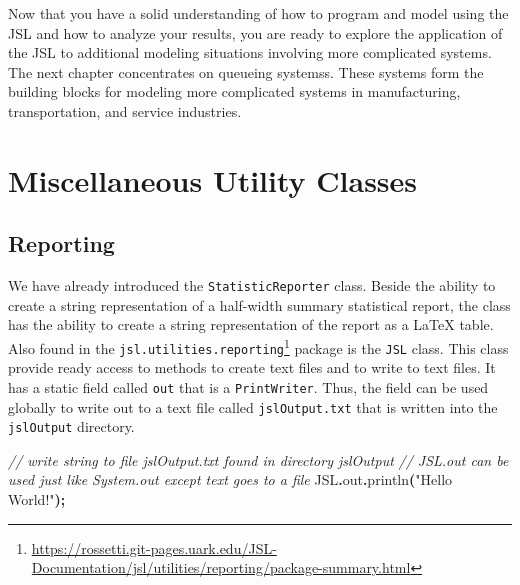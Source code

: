 \documentclass[
]{book}
\newenvironment{Shaded}{\begin{snugshade}}{\end{snugshade}}
\newcommand{\CommentTok}[1]{\textcolor[rgb]{0.56,0.35,0.01}{\textit{#1}}}
\newcommand{\FunctionTok}[1]{\textcolor[rgb]{0.00,0.00,0.00}{#1}}
\newcommand{\NormalTok}[1]{#1}
\newcommand{\OperatorTok}[1]{\textcolor[rgb]{0.81,0.36,0.00}{\textbf{#1}}}
\newcommand{\StringTok}[1]{\textcolor[rgb]{0.31,0.60,0.02}{#1}}
\renewcommand{\href}[2]{#2\footnote{\url{#1}}}
\theoremstyle{definition}
\theoremstyle{definition}
\theoremstyle{definition}
\theoremstyle{definition}
\theoremstyle{remark}
\begin{document}
Now that you have a solid understanding of how to program and model
using the JSL and how to analyze your results, you are ready to explore
the application of the JSL to additional modeling situations involving
more complicated systems. The next chapter concentrates on queueing
systemss. These systems form the building blocks for modeling more
complicated systems in manufacturing, transportation, and service
industries.

\cleardoublepage

\hypertarget{appendix-appendix}{%
\appendix {}}


\hypertarget{miscellaneous-utility-classes}{%
\chapter{Miscellaneous Utility Classes}\label{miscellaneous-utility-classes}}

\hypertarget{reporting}{%
\section{Reporting}\label{reporting}}

We have already introduced the \texttt{StatisticReporter} class. Beside the ability to create a string representation of a half-width summary statistical report, the class has the ability to create a string representation of the report as a LaTeX table. Also found in the \href{https://rossetti.git-pages.uark.edu/JSL-Documentation/jsl/utilities/reporting/package-summary.html}{\texttt{jsl.utilities.reporting}} package is the \texttt{JSL} class. This class provide ready access to methods to create text files and to write to text files. It has a static field called \texttt{out} that is a \texttt{PrintWriter}. Thus, the field can be used globally to write out to a text file called \texttt{jslOutput.txt} that is written into the \texttt{jslOutput} directory.

\begin{Shaded}
\begin{Highlighting}[]
\CommentTok{// write string to file jslOutput.txt found in directory jslOutput}
\CommentTok{// JSL.out can be used just like System.out except text goes to a file}
\NormalTok{JSL}\OperatorTok{.}\FunctionTok{out}\OperatorTok{.}\FunctionTok{println}\OperatorTok{(}\StringTok{"Hello World!"}\OperatorTok{);}
\end{Highlighting}
\end{Shaded}
\end{document}
